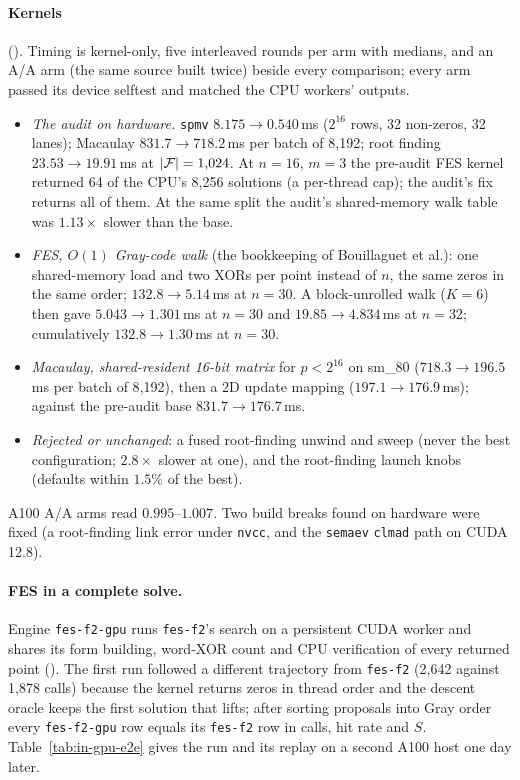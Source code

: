 \paragraph{Kernels} ().
Timing is kernel-only, five interleaved rounds per arm with medians, and an
A/A arm (the same source built twice) beside every comparison; every arm
passed its device selftest and matched the CPU workers' outputs.
\begin{itemize}
\item \emph{The audit on hardware.} \texttt{spmv} $8.175\to0.540$\,ms
  ($2^{16}$ rows, 32 non-zeros, 32 lanes); Macaulay $831.7\to718.2$\,ms per
  batch of 8{,}192; root finding $23.53\to19.91$\,ms at $\lvert \mathcal{F} \rvert=1{,}024$.
  At $n=16$, $m=3$ the pre-audit FES kernel returned 64 of the CPU's 8{,}256
  solutions (a per-thread cap); the audit's fix returns all of them. At
  the same split the audit's shared-memory walk table was $1.13\times$
  slower than the base.
\item \emph{FES, $O(1)$ Gray-code walk} (the bookkeeping of Bouillaguet et
  al.): one shared-memory load and two XORs per point instead of $n$, the
  same zeros in the same order; $132.8\to5.14$\,ms at $n=30$. A
  block-unrolled walk ($K=6$) then gave $5.043\to1.301$\,ms at $n=30$ and
  $19.85\to4.834$\,ms at $n=32$; cumulatively $132.8\to1.30$\,ms at $n=30$.
\item \emph{Macaulay, shared-resident 16-bit matrix} for $p<2^{16}$ on
  sm\_80 ($718.3\to196.5$\,ms per batch of 8{,}192), then a 2D update mapping
  ($197.1\to176.9$\,ms); against the pre-audit base $831.7\to176.7$\,ms.
\item \emph{Rejected or unchanged}: a fused root-finding unwind and sweep
  (never the best configuration; $2.8\times$ slower at one), and the
  root-finding launch knobs (defaults within $1.5\%$ of the best).
\end{itemize}
A100 A/A arms read $0.995$--$1.007$. Two build breaks found on hardware
were fixed (a root-finding link error under \texttt{nvcc}, and the
\texttt{semaev} \texttt{clmad} path on CUDA 12.8).

\paragraph{FES in a complete solve.} Engine \texttt{fes-f2-gpu} runs
\texttt{fes-f2}'s search on a persistent CUDA worker and shares its form
building, word-XOR count and CPU verification of every returned point
(). The first run followed a
different trajectory from \texttt{fes-f2} (2{,}642 against 1{,}878 calls)
because the kernel returns zeros in thread order and the descent oracle
keeps the first solution that lifts; after sorting proposals into Gray
order every \texttt{fes-f2-gpu} row equals its \texttt{fes-f2} row in calls,
hit rate and $S$. Table~\ref{tab:in-gpu-e2e} gives the run and its replay on a
second A100 host one day later.

